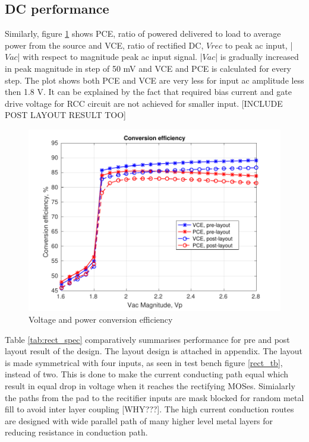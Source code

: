 \documentclass[UKenglish]{ifimaster}  %
\begin{document}
\subsection{DC performance}		%

Similarly, figure  \ref{rect_ce} shows PCE, ratio of powered delivered to load to average power from the source and 
VCE, ratio of rectified DC, $Vrec$ to peak ac input, |$Vac$| with respect to magnitude peak ac input signal. |$Vac$| is gradually increased in 
peak magnitude in step of 50 mV and VCE and PCE is calculated for every step. The plot shows both 
PCE and VCE are very less for input ac amplitude less then 1.8 V. It can be explained by the fact that required 
bias current and gate drive voltage for RCC circuit are not achieved for smaller input. [INCLUDE POST LAYOUT RESULT TOO] \\

\begin{figure}[htbp] %
   \centering
   \includegraphics[width=\textwidth]{img/rectifier_ce.pdf} 
   \caption{Voltage and power conversion efficiency}
   \label{rect_ce}
\end{figure}

Table \ref{tab:rect_spec} comparatively summarises performance for pre and post layout result of the design. The layout design is attached in appendix. The layout 
is made symmetrical with four inputs, as seen in test bench figure \ref{rect_tb}, instead of two. This is done to make the current conducting path equal which result in 
equal drop in voltage when it reaches the rectifying MOSes. Simialarly the paths from the pad to the recitifier inputs are mask blocked for random metal fill to avoid 
inter layer coupling [WHY???]. The high current conduction routes are designed with wide parallel path of many higher level metal layers for reducing resistance in conduction path.
\end{document}
